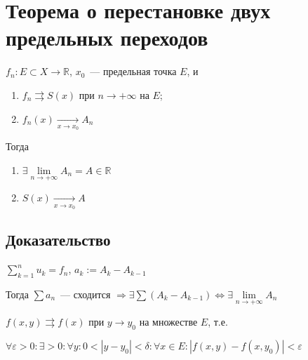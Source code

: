 \documentclass{article}
\begin{document}
    \newpage
    
    \section{Теорема о перестановке двух предельных переходов}
    
        $f_n : E \subset X \rightarrow \mathbb{R}$, $x_0$~--- предельная точка $E$, и
        
        \begin{enumerate}
        
            \item $f_n \rightrightarrows S(x)$ при $n \rightarrow +\infty$ на $E$;
            
            \item $f_n(x) \xrightarrow[x \rightarrow x_0]{} A_n$
            
        \end{enumerate}
        
        Тогда
        
        \begin{enumerate}
        
            \item $\exists \lim\limits_{n \rightarrow +\infty} A_n = A \in \mathbb{R}$
            
            \item $S(x) \xrightarrow[x \rightarrow x_0]{} A$
            
        \end{enumerate}
        
        \subsection{Доказательство}
        
            $\sum\limits^n_{k = 1} u_k = f_n$, $a_k := A_k - A_{k - 1}$
            
            Тогда $\sum a_n$~--- сходится $\Rightarrow \exists \sum \left( A_k - A_{k - 1} \right) \Leftrightarrow \exists \lim\limits_{n \rightarrow +\infty} A_n$
            
            $f(x, y) \rightrightarrows f(x)$ при $y \rightarrow y_0$ на множестве $E$, т.е.
            
            $\forall \varepsilon > 0 : \exists > 0 : \forall y : 0 < | y - y_0 | < \delta : \forall x \in E : | f(x, y) - f(x, y_0) | < \varepsilon$
            
    \newpage
    
\end{document}
